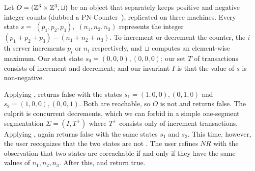 \begin{example}
  Let $O = (\mathbb{Z}^3 \times \mathbb{Z}^3, \sqcup)$ be an object that separately keeps
  positive and negative integer counts (dubbed a
  PN-Counter~\cite{shapiro2011comprehensive}), replicated on three machines.
  Every state $s = $ $(p_1, p_2, p_3),$ $(n_1, n_2, n_3)$ represents the
  integer $(p_1 + p_2 + p_3) - (n_1 + n_2 + n_3)$. To increment or decrement
  the counter, the $i$th server increments $p_i$ or $n_i$ respectively, and
  $\sqcup$ computes an element-wise maximum. Our start state $s_0 = (0, 0, 0),
  (0, 0, 0)$; our set $T$ of transactions consists of increment and decrement;
  and our invariant $I$ is that the value of $s$ is non-negative.

  Applying , \IsIclosed{} returns false
  with the states $s_1 = (1, 0, 0), (0, 1, 0)$ and $s_2 = (1, 0, 0), (0, 0,
  1)$. Both are reachable, so $O$ is not \sTIconfluent{} and
   returns false.  The culprit is
  concurrent decrements, which we can forbid in a simple one-segment
  segmentation $\Sigma = (I, T^+)$ where $T^+$ consists only of increment
  transactions. Applying ,
  \IsIclosed{} again returns false with the same states $s_1$ and $s_2$. This time,
  however, the user recognizes that the two states are not
  . The user refines $NR$ with the observation that two
  states are coreachable if and only if they have the same values of $n_1, n_2,
  n_3$. After this, \IsIclosed{} and
   return true.
\end{example}
